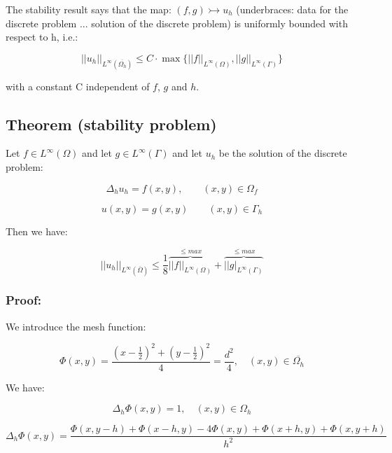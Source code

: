 The stability result says that the map: $(f, g) \rightarrowtail u_h$ (underbraces: data for the discrete problem ... solution of the discrete problem) is uniformly bounded with respect to h, i.e.:

\begin{equation*}
||u_h||_{L^\infty(\overline{\Omega_h})} \le C \cdot \max \{ ||f||_{L^\infty(\Omega)}, ||g||_{L^\infty(\Gamma)} \}
\end{equation*}

with a constant C independent of $f$, $g$ and $h$.

\subsection{Theorem (stability problem)}

Let $f \in L^\infty(\Omega)$ and let $g \in L^\infty(\Gamma)$ and let $u_h$ be the solution of the discrete problem:

\begin{equation*}
\Delta_h u_h = f(x, y), \qquad (x, y) \in \Omega_f
\end{equation*}

\begin{equation*}
u(x, y) = g(x, y) \qquad (x, y) \in \Gamma_h
\end{equation*}

Then we have:

\begin{equation*}
{||u_h||}_{L^\infty(\overline{\Omega})} \le \frac{1}{8} \overbrace{{||f||}_{L^\infty(\Omega)}}^{\le max} + \overbrace{{||g|}_{L^\infty(\Gamma)}}^{\le max}
\end{equation*}


\subsubsection{Proof:}
We introduce the mesh function:

\begin{equation*}
\Phi(x, y) = \frac{(x - \frac{1}{2})^2 + (y - \frac{1}{2})^2}{4} = \frac{d^2}{4}, \quad (x, y) \in \overline{\Omega_h}
\end{equation*}

We have:

\begin{equation*}
\Delta_h \Phi(x, y) = 1, \quad (x, y) \in \Omega_h
\end{equation*}

\begin{equation*}
\Delta_h \Phi(x, y) = \frac{\Phi(x, y-h) + \Phi(x - h, y) - 4 \Phi(x, y) + \Phi(x + h, y) + \Phi(x, y + h)}{h^2}
\end{equation*}

